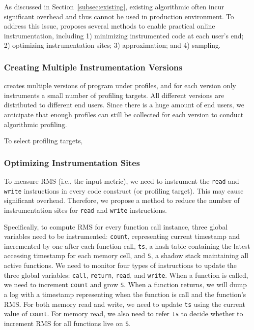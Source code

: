 As discussed in Section~\ref{subsec:existing}, existing algorithmic
often incur significant overhead and thus cannot be used in production
environment. To address this issue, \Tool proposes several 
methods to enable practical online instrumentation, including 1) 
minimizing instrumented code at each user's end; 2) optimizing instrumentation sites;
3) approximation; and 4) sampling. 


\subsubsection{Creating Multiple Instrumentation Versions}

\Tool creates multiple versions of program under profiles, 
and for each version \Tool only instruments a small number of 
profiling targets. 
All different versions are distributed to different end users. 
Since there is a huge amount of end users, 
we anticipate that enough profiles can still be collected 
for each version to conduct algorithmic profiling. 

To select profiling targets, 


\subsubsection{Optimizing Instrumentation Sites}


To measure RMS (i.e., the input metric), we need to instrument
the  \texttt{read} and \texttt{write} instructions in every 
code construct (or profiling target). 
This may cause significant overhead. Therefore, 
we propose a method to reduce the number of 
instrumentation sites for \texttt{read} and \texttt{write} instructions. 

Specifically, to compute RMS for every function call instance, 
three global variables need to be instrumented:
\texttt{count}, representing current timestamp 
and incremented by one after each function call,
\texttt{ts}, a hash table containing the latest accessing timestamp 
for each memory cell,
and \texttt{S}, a shadow stack maintaining all active functions. 
We need to monitor four types of instructions to 
update the three global variables:
\texttt{call}, \texttt{return}, \texttt{read}, and \texttt{write}.
When a function is called, 
we need to increment \texttt{count} and grow \texttt{S}.
When a function returns, 
we will dump a log with a timestamp 
representing when the function is call 
and the function's RMS.
For both memory read and write, we need to update \texttt{ts} 
using the current value of \texttt{count}. 
For memory read, we also need to refer \texttt{ts} to decide 
whether to increment RMS for all functions live on \texttt{S}.

